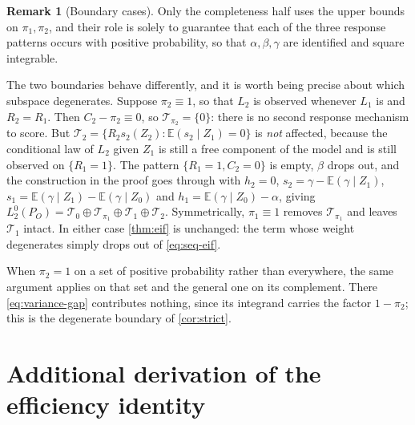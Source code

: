 \documentclass[11pt]{article}
\theoremstyle{definition}
\newtheorem{remark}{Remark}
\newcommand{\E}{\mathbb{E}}
\newcommand{\1}{\mathbf{1}}
\begin{document}
\begin{remark}[Boundary cases]\label{rem:boundary}
Only the completeness half uses the upper bounds on $\pi_1,\pi_2$, and their
role is solely to guarantee that each of the three response patterns occurs
with positive probability, so that $\alpha,\beta,\gamma$ are identified and
square integrable.

The two boundaries behave differently, and it is worth being precise about
which subspace degenerates. Suppose $\pi_2\equiv1$, so that $L_2$ is observed
whenever $L_1$ is and $R_2=R_1$. Then $C_2-\pi_2\equiv0$, so
$\mathcal T_{\pi_2}=\{0\}$: there is no second response mechanism to score.
But $\mathcal T_2=\{R_2s_2(Z_2):\E(s_2\mid Z_1)=0\}$ is \emph{not} affected,
because the conditional law of $L_2$ given $Z_1$ is still a free component of
the model and is still observed on $\{R_1=1\}$. The pattern
$\{R_1=1,C_2=0\}$ is empty, $\beta$ drops out, and the construction in the proof
goes through with $h_2=0$, $s_2=\gamma-\E(\gamma\mid Z_1)$,
$s_1=\E(\gamma\mid Z_1)-\E(\gamma\mid Z_0)$ and $h_1=\E(\gamma\mid Z_0)-\alpha$,
giving $L_2^0(P_O)=\mathcal T_0\oplus\mathcal T_{\pi_1}\oplus\mathcal T_1
\oplus\mathcal T_2$. Symmetrically, $\pi_1\equiv1$ removes
$\mathcal T_{\pi_1}$ and leaves $\mathcal T_1$ intact. In either case
\cref{thm:eif} is unchanged: the term whose weight degenerates simply drops out
of \cref{eq:seq-eif}.

When $\pi_2=1$ on a set of positive probability rather than everywhere, the same
argument applies on that set and the general one on its complement. There
\cref{eq:variance-gap} contributes nothing, since its integrand carries the
factor $1-\pi_2$; this is the degenerate boundary of \cref{cor:strict}.
\end{remark}

\section{Additional derivation of the efficiency identity}\label{app:efficiency}
\end{document}
